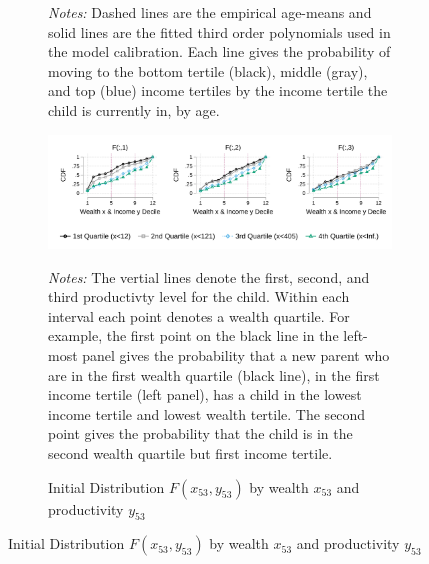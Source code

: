 \documentclass[12pt]{article}
\begin{document}
\begin{figure}
\begin{subfigure}{\textwidth}
		{\begin{footnotesize}\textit{Notes:}
			Dashed lines are the empirical age-means and solid lines are the fitted third order polynomials used in the model calibration. Each line gives the probability of moving to the bottom tertile (black), middle (gray), and top (blue) income tertiles by the income tertile the child is currently in, by age. \end{footnotesize}}
	\end{subfigure}

	
	\begin{subfigure}{\textwidth}
		\caption{Initial Distribution $F(x_{53},y_{53})$ by wealth $x_{53}$ and productivity $y_{53}$}\label{fig:inidistr}
		\includegraphics[width=1\textwidth]{../tabfig/empirical/inidistr} 
		{\begin{footnotesize}\textit{Notes:} The vertial lines denote the first, second, and third productivty level for the child. Within each interval each point denotes a wealth quartile. For example, the first point on the black line in the left-most panel gives the probability that a new parent who are in the first wealth quartile (black line), in the first income tertile (left panel), has a child in the lowest income tertile and lowest wealth tertile. The second point gives the probability that the child is in the second wealth quartile but first income tertile. \end{footnotesize}}
		\end{subfigure}
\end{figure}
\end{document}
